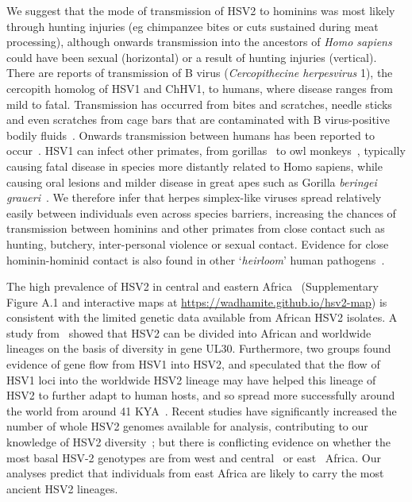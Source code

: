 \documentclass[fleqn,10pt]{wlscirep}
\begin{document}
We suggest that the mode of transmission of HSV2 to hominins was most likely through hunting injuries (eg chimpanzee bites or cuts sustained during meat processing), although onwards transmission into the ancestors of \textit{Homo sapiens} could have been sexual (horizontal) or a result of hunting injuries (vertical). There are reports of transmission of B virus (\textit{Cercopithecine herpesvirus} 1), the cercopith homolog of HSV1 and ChHV1, to humans, where disease ranges from mild to fatal. Transmission has occurred from bites and scratches, needle sticks and even scratches from cage bars that are contaminated with B virus-positive bodily fluids~\citep{Huff2003}. Onwards transmission between humans has been reported to occur~\citep{CDC1987}. HSV1 can infect other primates, from gorillas~\citep{Gilardi2014} to owl monkeys~\citep{Melendez1969}, typically causing fatal disease in species more distantly related to Homo sapiens, while causing oral lesions and milder disease in great apes such as Gorilla \textit{beringei graueri}~\citep{Gilardi2014}. We therefore infer that herpes simplex-like viruses spread relatively easily between individuals even across species barriers, increasing the chances of transmission between hominins and other primates from close contact such as hunting, butchery, inter-personal violence or sexual contact. Evidence for close hominin-hominid contact is also found in other `\textit{heirloom}' human pathogens~\citep{Houldcroft2017a}.

The high prevalence of HSV2 in central and eastern Africa~\citep{Looker2015} (Supplementary Figure A.1 and interactive maps at \url{https://wadhamite.github.io/hsv2-map}) is consistent with the limited genetic data available from African HSV2 isolates. A study from~\citep{Burrel2015} showed that HSV2 can be divided into African and worldwide lineages on the basis of diversity in gene UL30. Furthermore, two groups found evidence of gene flow from HSV1 into HSV2, and speculated that the flow of HSV1 loci into the worldwide HSV2 lineage may have helped this lineage of HSV2 to further adapt to human hosts, and so spread more successfully around the world from around 41 KYA~\citep{Burrel2015,Koelle2017}. Recent studies have significantly increased the number of whole HSV2 genomes available for analysis, contributing to our knowledge of HSV2 diversity~\citep{Kolb2015,Szpara2014}; but there is conflicting evidence on whether the most basal HSV-2 genotypes are from west and central~\citep{Burrel2017} or east~\citep{Koelle2017} Africa. Our analyses predict that individuals from east Africa are likely to carry the most ancient HSV2 lineages. 
\end{document}
